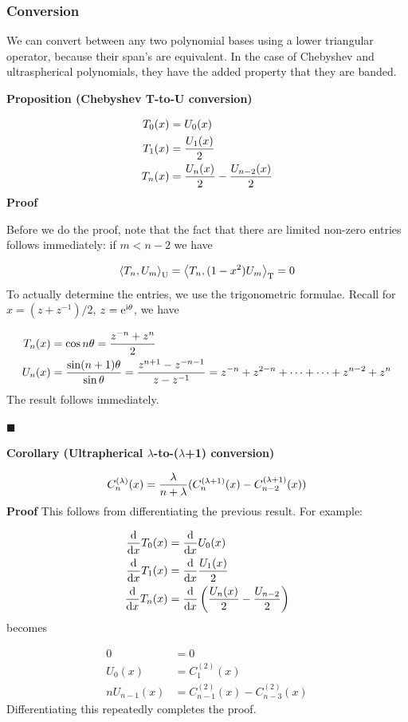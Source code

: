 \documentclass[12pt,a4paper]{article}
\def\D{ {\rm d} }
\def\I{ {\rm i} }
\def\E{ {\rm e} }
\def\ip<#1>{\left\langle{#1}\right\rangle}
\def\dx{\D x}
\begin{document}
\subsubsection{Conversion}
We can convert between any two polynomial bases using a lower triangular operator, because their span's are equivalent.  In the case of Chebyshev and ultraspherical polynomials, they have the added property that they are banded.

\textbf{Proposition (Chebyshev T-to-U conversion)} 


\begin{align*}
 T_0(x) &= U_0(x) \\
 T_1(x) &= {U_1(x) \over 2} \\
 T_n(x) &= {U_n(x) \over 2} - {U_{n-2}(x) \over 2}
\end{align*}
\textbf{Proof} 

Before we do the proof, note that the fact that there are limited non-zero entries follows immediately: if $m < n-2$ we have

\[
\ip<T_n, U_m>_{\rm U} = \ip<T_n, (1-x^2)U_m>_{\rm T} = 0
\]
To actually determine the entries, we use the trigonometric formulae. Recall for $x = (z + z^{-1})/2$, $z = \E^{\I \theta}$, we have


\begin{align*}
T_n(x) &= \cos n \theta = {z^{-n} + z^n \over 2}\\
U_n(x) &= {\sin (n+1) \theta \over \sin \theta} = {z^{n+1} - z^{-n-1} \over z - z^{-1}} = z^{-n} + z^{2-n} + \cdots +  \cdots + z^{n-2} + z^n 
\end{align*}
The result follows immediately.

\ensuremath{\blacksquare}

\textbf{Corollary (Ultrapherical \ensuremath{\lambda}-to-(\ensuremath{\lambda}+1) conversion)}

\[
C_n^{(\lambda)}(x) = {\lambda \over n+ \lambda} (C_n^{(\lambda+1)}(x) - C_{n-2}^{(\lambda+1)}(x))
\]
\textbf{Proof} This follows from differentiating the previous result. For example:


\begin{align*}
 {\D\over \dx} T_0(x) &= {\D\over \dx} U_0(x) \\
 {\D\over \dx} T_1(x) &= {\D\over \dx} {U_1(x) \over 2} \\
{\D\over \dx} T_n(x) &= {\D\over \dx} \left({U_n(x) \over 2} - {U_{n-2} \over 2} \right)
\end{align*}
becomes


\begin{align*}
    0 &= 0\\
    U_0(x) &= C_1^{(2)}(x) \\
   n U_{n-1}(x) &= C_{n-1}^{(2)}(x)  - C_{n-3}^{(2)}(x)
\end{align*}
Differentiating this repeatedly completes the proof.
\end{document}
